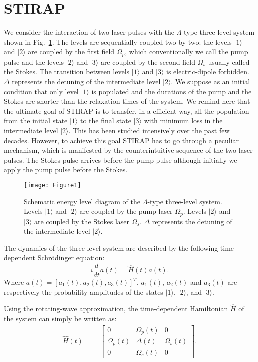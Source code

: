 \documentclass[]{interact}
\theoremstyle{plain}%
\theoremstyle{definition}
\theoremstyle{remark}
\begin{document}
\section{STIRAP}
We consider the interaction of two laser pulses with the $\Lambda$-type 
three-level system shown in Fig.~\ref{fig:lambda_system}. The levels are
sequentially coupled two-by-two: the levels 
$|1\rangle$ and $|2\rangle$ are coupled by the first field  $\Omega_p$, 
which conventionally we call the pump pulse and the levels $|2\rangle$ and 
$|3\rangle$ 
are coupled by the second field  $\Omega_s$ usually called the Stokes. The 
transition between levels $|1\rangle$ and $|3\rangle$ is electric-dipole 
forbidden. $\Delta$ represents the detuning of the intermediate level 
$|2\rangle$. We suppose as an initial condition that only level $|1\rangle$ is 
populated and the durations of the pump and the Stokes are shorter than 
the relaxation times of the system. 
We remind here that the ultimate goal of STIRAP is to transfer, in 
a efficient way, all the population from the initial state $|1\rangle$ to the 
final state 
$|3\rangle$ with minimum loss in 
the intermediate level $|2\rangle$. This has been studied intensively over the 
past few decades. However, to achieve this goal STIRAP has to go 
through a peculiar mechanism, which is manifested by the counterintuitive 
sequence of the two laser pulses. The Stokes pulse arrives before the pump 
pulse although initially we apply the pump pulse before the Stokes.
\begin{figure}[h!]
\centering
\texttt{[image: Figure1]}
 \caption{Schematic energy level diagram of the $\Lambda$-type three-level 
system. Levels $|1\rangle$ and $|2\rangle$ are coupled by the pump laser 
$\Omega_p$. 
Levels $|2\rangle$ and $|3\rangle$ are coupled by 
the Stokes laser  $\Omega_s$. $\Delta$ represents the detuning of 
the intermediate level $|2\rangle$. \label{fig:lambda_system}}
\end{figure}
The dynamics of the three-level system are described by the 
following time-dependent Schr\"{o}dinger equation: 
\begin{equation}
 i\frac{d}{d t}a(t) = \hat{H}(t) a(t). 
 \label{eq:dynamique}
\end{equation}
Where $a(t)=[a_1(t), a_2(t), a_3(t)]^T$, $a_1(t)$, $a_2(t)$ and $a_3(t)$ are 
respectively the probability amplitudes of the states $|1\rangle$, 
$|2\rangle$, and $|3\rangle$.\ 

Using the rotating-wave approximation, the time-dependent Hamiltonian 
$\hat{H}$ of the system can simply be written as:
\begin{eqnarray}
     \hat{H}(t) &=& 
 \begin{bmatrix}
        0 &  \Omega_p(t) &  0 \\
       \Omega_p(t) & \Delta(t) & \Omega_s(t) \\
       0 &  \Omega_s(t) &  0 
 \end{bmatrix}.
 \label{eq:Ham1}
\end{eqnarray}
\end{document}
